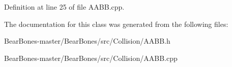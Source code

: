 Definition at line 25 of file A\+A\+B\+B.\+cpp.



The documentation for this class was generated from the following files\+:\begin{DoxyCompactItemize}
\item 
Bear\+Bones-\/master/\+Bear\+Bones/src/\+Collision/A\+A\+B\+B.\+h\item 
Bear\+Bones-\/master/\+Bear\+Bones/src/\+Collision/A\+A\+B\+B.\+cpp\end{DoxyCompactItemize}

